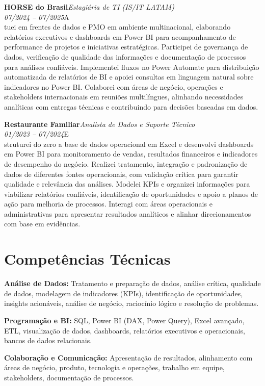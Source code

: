 \documentclass[11pt,a4paper]{article}
\newcommand{\cvrole}[4]{%
  \vspace{4pt}%
  {\bfseries\color{accentcolor}#1}\hfill{\itshape #2}\\[-2pt]%
  {\itshape #3}\hfill #4\\[6pt]%
}
\begin{document}
\cvrole{HORSE do Brasil}{Estagiária de TI (IS/IT LATAM)}{07/2024 -- 07/2025}

Atuei em frentes de dados e PMO em ambiente multinacional, elaborando relatórios executivos e dashboards em Power BI para acompanhamento de performance de projetos e iniciativas estratégicas. Participei de governança de dados, verificação de qualidade das informações e documentação de processos para análises confiáveis. Implementei fluxos no Power Automate para distribuição automatizada de relatórios de BI e apoiei consultas em linguagem natural sobre indicadores no Power BI. Colaborei com áreas de negócio, operações e stakeholders internacionais em reuniões multilíngues, alinhando necessidades analíticas com entregas técnicas e contribuindo para decisões baseadas em dados.

\cvrole{Restaurante Familiar}{Analista de Dados e Suporte Técnico}{01/2023 -- 07/2024}

Estruturei do zero a base de dados operacional em Excel e desenvolvi dashboards em Power BI para monitoramento de vendas, resultados financeiros e indicadores de desempenho do negócio. Realizei tratamento, integração e padronização de dados de diferentes fontes operacionais, com validação crítica para garantir qualidade e relevância das análises. Modelei KPIs e organizei informações para viabilizar relatórios confiáveis, identificação de oportunidades e apoio a planos de ação para melhoria de processos. Interagi com áreas operacionais e administrativas para apresentar resultados analíticos e alinhar direcionamentos com base em evidências.

\section{Competências Técnicas}

\textbf{Análise de Dados:} Tratamento e preparação de dados, análise crítica, qualidade de dados, modelagem de indicadores (KPIs), identificação de oportunidades, insights acionáveis, análise de negócio, raciocínio lógico e resolução de problemas.

\textbf{Programação e BI:} SQL, Power BI (DAX, Power Query), Excel avançado, ETL, visualização de dados, dashboards, relatórios executivos e operacionais, bancos de dados relacionais.

\textbf{Colaboração e Comunicação:} Apresentação de resultados, alinhamento com áreas de negócio, produto, tecnologia e operações, trabalho em equipe, stakeholders, documentação de processos.
\end{document}
